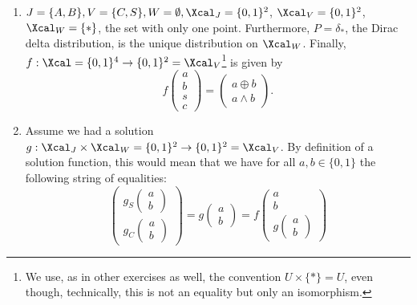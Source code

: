 \begin{enumerate}[label=9.\arabic*]
    \begin{gradedsolution}
        \begin{enumerate}
            \item {} $J=\{A, B\}, V = \{C, S\}, W = \emptyset, \Xcal_J = \{0, 1\}^{2}$, $\Xcal_V = \{0,1\}^{2}$, $\Xcal_W = \{*\}$, the set with only one point. Furthermore, $P = \delta_*$, the Dirac delta distribution, is the unique distribution on $\Xcal_W$. Finally, $f: \Xcal = \{0,1\}^{4} \to \{0,1\}^{2} = \Xcal_V$\footnote{We use, as in other exercises as well, the convention $U \times \{*\} = U$, even though, technically, this is not an equality but only an isomorphism.} is given by
            \begin{equation}
                f \begin{pmatrix} a \\ b \\ s \\ c \end{pmatrix} = \begin{pmatrix} a \oplus b \\ a \wedge b\end{pmatrix}.
                \label{eq:causal_mechanism_half_adder}
            \end{equation}
            \item {} Assume we had a solution $g: \Xcal_J\times \Xcal_W = \{0,1\}^2 \to \{0,1\}^2 = \Xcal_V$.
            By definition of a solution function, this would mean that we have for all $a, b \in \{0,1\}$ the following string of equalities:
            \begin{equation}
                \begin{pmatrix} g_S \begin{pmatrix} a \\ b\end{pmatrix} \\ g_C \begin{pmatrix} a \\ b \end{pmatrix}\end{pmatrix}
                = g \begin{pmatrix} a \\ b\end{pmatrix}
                = f \begin{pmatrix} a \\ b \\ g \begin{pmatrix} a \\ b\end{pmatrix}\end{pmatrix}

\end{equation}
\end{enumerate}
\end{gradedsolution}
\end{enumerate}
